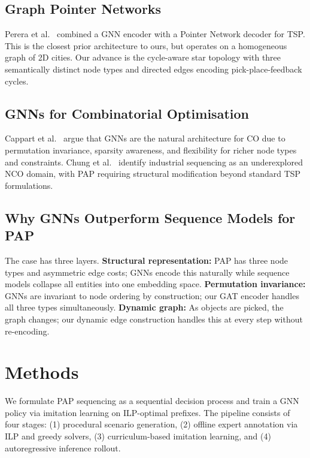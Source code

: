 \documentclass[conference]{IEEEtran}
\begin{document}
\subsection{Graph Pointer Networks}

Perera et al.\ \cite{perera2023gpn} combined a GNN encoder with a Pointer Network decoder for TSP. This is the closest prior architecture to ours, but operates on a homogeneous graph of 2D cities. Our advance is the cycle-aware star topology with three semantically distinct node types and directed edges encoding pick-place-feedback cycles.

\subsection{GNNs for Combinatorial Optimisation}

Cappart et al.\ \cite{cappart2023gnnco} argue that GNNs are the natural architecture for CO due to permutation invariance, sparsity awareness, and flexibility for richer node types and constraints. Chung et al.\ \cite{chung2025ncosurvey} identify industrial sequencing as an underexplored NCO domain, with PAP requiring structural modification beyond standard TSP formulations.

\subsection{Why GNNs Outperform Sequence Models for PAP}

The case has three layers. \textbf{Structural representation:} PAP has three node types and asymmetric edge costs; GNNs encode this naturally while sequence models collapse all entities into one embedding space. \textbf{Permutation invariance:} GNNs are invariant to node ordering by construction; our GAT encoder handles all three types simultaneously. \textbf{Dynamic graph:} As objects are picked, the graph changes; our dynamic edge construction handles this at every step without re-encoding.

\section{Methods}\label{sec:methods}

We formulate PAP sequencing as a sequential decision process and train a GNN policy via imitation learning on ILP-optimal prefixes. The pipeline consists of four stages: (1) procedural scenario generation, (2) offline expert annotation via ILP and greedy solvers, (3) curriculum-based imitation learning, and (4) autoregressive inference rollout.
\end{document}
